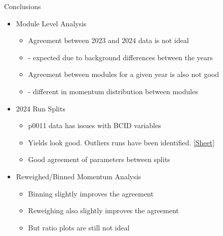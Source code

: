 \begin{frame}{Conclusions}
    \begin{itemize}
        \item Module Level Analysis
        \begin{itemize}
            \item Agreement between 2023 and 2024 data is not ideal 
            \item[] - expected due to background differences between the years
            \item Agreement between modules for a given year is also not good 
            \item[] - different in momentum distribution between modules
        \end{itemize}
        \item 2024 Run Splits
        \begin{itemize}
            \item p0011 data has issues with BCID variables
            \item Yields look good. Outliers runs have been identified. \href{https://docs.google.com/spreadsheets/d/1nnYFcmhVieSHI5XAVhPiW1K6CoGYGxv2YPchwL0sqH4/edit?usp=sharing}{[Sheet]}
            \item Good agreement of parameters between splits
        \end{itemize}
        \item Reweighed/Binned Momentum Analysis
        \begin{itemize}
            \item Binning slightly improves the agreement 
            \item Reweighing also slightly improves the agreement
            \item But ratio plots are still not ideal
        \end{itemize}
    \end{itemize}
\end{frame}